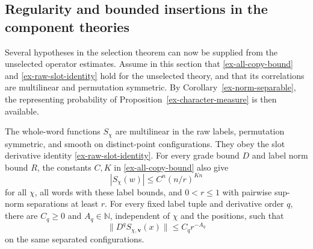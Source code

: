\subsection{Regularity and bounded insertions in the component theories}
\label{ex-phase-regularity}

Several hypotheses in the selection theorem can now be supplied from the
unselected operator estimates. Assume in this section that
\eqref{ex-all-copy-bound} and \eqref{ex-raw-slot-identity} hold for the
unselected theory, and that its correlations are multilinear and
permutation symmetric. By Corollary~\ref{ex-norm-separable}, the
representing probability of Proposition~\ref{ex-character-measure}
is then available.

\begin{proposition}
\label{ex-phase-caps}
The whole-word functions \(S_\chi\) are multilinear in the raw labels,
permutation symmetric, and smooth on distinct-point configurations.
They obey the slot derivative identity \eqref{ex-raw-slot-identity}.
For every grade bound \(D\) and label norm bound \(R\), the constants
\(C,K\) in \eqref{ex-all-copy-bound} also give
\begin{equation}\label{ex-phase-zeroth-cap}
 |S_\chi(w)|\le C^n(n/r)^{Kn}
\end{equation}
for all \(\chi\), all words with these label bounds, and
\(0<r\le1\) with pairwise sup-norm separations at least \(r\).
For every fixed label tuple and derivative order \(q\), there are
\(C_q\ge0\) and \(A_q\in\mathbb N\), independent of \(\chi\)
and the positions, such that
\[
 \|D^qS_{\chi,\boldsymbol v}(x)\|\le C_qr^{-A_q}
\]
on the same separated configurations.
\end{proposition}
